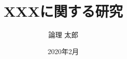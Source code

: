 \documentclass[a4paper,12pt]{jbook}
\title{XXXに関する研究}
\date{2020年2月}
\author{論理 太郎}
\begin{document}
\maketitle


\tableofcontents    %
\listoffigures      %
\listoftables       %
\lstlistoflistings  %









\end{document}
